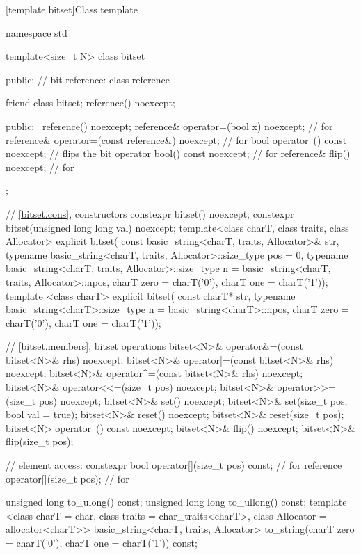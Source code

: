 [template.bitset]{Class template }%
%
\begin{codeblock}
namespace std {
  template<size_t N> class bitset {
  public:
    // bit reference:
    class reference {
      friend class bitset;
      reference() noexcept;

    public:
      ~reference() noexcept;
      reference& operator=(bool x) noexcept;            // for 
      reference& operator=(const reference&) noexcept;  // for 
      bool operator~() const noexcept;                  // flips the bit
      operator bool() const noexcept;                   // for 
      reference& flip() noexcept;                       // for 
    };

    // \ref{bitset.cons}, constructors
    constexpr bitset() noexcept;
    constexpr bitset(unsigned long long val) noexcept;
    template<class charT, class traits, class Allocator>
      explicit bitset(
        const basic_string<charT, traits, Allocator>& str,
        typename basic_string<charT, traits, Allocator>::size_type pos = 0,
        typename basic_string<charT, traits, Allocator>::size_type n
          = basic_string<charT, traits, Allocator>::npos,
        charT zero = charT('0'),
        charT one = charT('1'));
    template <class charT>
      explicit bitset(
        const charT* str,
        typename basic_string<charT>::size_type n = basic_string<charT>::npos,
        charT zero = charT('0'),
        charT one = charT('1'));

    // \ref{bitset.members}, bitset operations
    bitset<N>& operator&=(const bitset<N>& rhs) noexcept;
    bitset<N>& operator|=(const bitset<N>& rhs) noexcept;
    bitset<N>& operator^=(const bitset<N>& rhs) noexcept;
    bitset<N>& operator<<=(size_t pos) noexcept;
    bitset<N>& operator>>=(size_t pos) noexcept;
    bitset<N>& set() noexcept;
    bitset<N>& set(size_t pos, bool val = true);
    bitset<N>& reset() noexcept;
    bitset<N>& reset(size_t pos);
    bitset<N>  operator~() const noexcept;
    bitset<N>& flip() noexcept;
    bitset<N>& flip(size_t pos);

    // element access:
    constexpr bool operator[](size_t pos) const;        // for 
    reference operator[](size_t pos);                   // for 

    unsigned long to_ulong() const;
    unsigned long long to_ullong() const;
    template <class charT = char,
              class traits = char_traits<charT>,
              class Allocator = allocator<charT>>
      basic_string<charT, traits, Allocator>
        to_string(charT zero = charT('0'), charT one = charT('1')) const;

}}
\end{codeblock}

